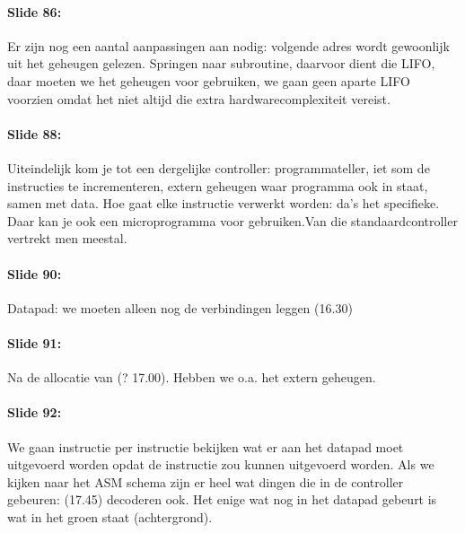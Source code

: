 \documentclass[10pt,a4paper]{book}
\begin{document}
\paragraph{Slide 86:} Er zijn nog een aantal aanpassingen aan nodig: volgende adres wordt gewoonlijk uit het geheugen gelezen. Springen naar subroutine, daarvoor dient die LIFO, daar moeten we het geheugen voor gebruiken, we gaan geen aparte LIFO voorzien omdat het niet altijd die extra hardwarecomplexiteit vereist. 

\paragraph{Slide 88:} Uiteindelijk kom je tot een dergelijke controller: programmateller, iet som de instructies te incrementeren, extern geheugen waar programma ook in staat, samen met data. Hoe gaat elke instructie verwerkt worden: da's het specifieke. Daar kan je ook een microprogramma voor gebruiken.Van die standaardcontroller vertrekt men meestal.

\paragraph{Slide 90:} Datapad: we moeten alleen nog de verbindingen leggen  (16.30)

\paragraph{Slide 91:} Na de allocatie van (? 17.00). Hebben we o.a. het extern geheugen.

\paragraph{Slide 92:} We gaan instructie per instructie bekijken wat er aan het datapad moet uitgevoerd worden opdat de instructie zou kunnen uitgevoerd worden. Als we kijken naar het ASM schema zijn er heel wat dingen die in de controller gebeuren: (17.45) decoderen ook. Het enige wat nog in het datapad gebeurt is wat in het groen staat (achtergrond).
\end{document}
